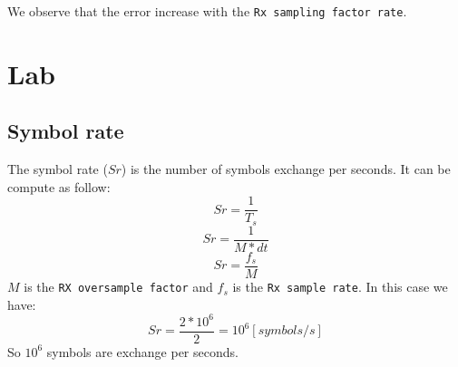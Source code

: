 \documentclass{article}
\begin{document}
We observe that the error increase with the \texttt{Rx sampling factor rate}.

\section{Lab}
    \subsection{Symbol rate}
        The symbol rate ($Sr$) is the number of symbols exchange per seconds. It can be compute as follow:
            $$Sr = \frac{1}{T_s}$$
            $$Sr = \frac{1}{M*dt}$$
            $$Sr = \frac{f_s}{M}$$
        $M$ is the \texttt{RX oversample factor} and $f_s$ is the \texttt{Rx sample rate}. In this case we have:
            $$Sr = \frac{2*10^{6}}{2} = 10^6[symbols/s]$$
        So $10^6$ symbols are exchange per seconds.
        
\end{document}
